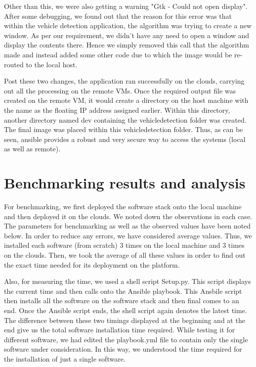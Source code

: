 \documentclass[9pt,twocolumn,twoside]{../../styles/osajnl}
\begin{document}
Other than this, we were also getting a warning "Gtk - Could not open display".  After some debugging, we found out that the reason for this error was that within the vehicle detection application, the algorithm was trying to create a new window.  As per our requirement, we didn't have any need to open a window and display the contents there.  Hence we simply removed this call that the algorithm made and instead added some other code due to which the image would be re-routed to the local host. 

Post these two changes, the application ran successfully on the clouds, carrying out all the processing on the remote VMs.  Once the required output file was created on the remote VM, it would create a directory on the host machine with the name as the floating IP address assigned earlier.  Within this directory, another directory named dev containing the vehicledetection folder was created.  The final image was placed within this vehicledetection folder.  Thus, as can be seen, ansible provides a robust and very secure way to access the systems (local as well as remote).  

\section{Benchmarking results and analysis}

For benchmarking, we first deployed the software stack onto the local
machine and then deployed it on the clouds.  We noted down the
observations in each case.  The parameters for benchmarking as well as
the observed values have been noted below.  In order to reduce any
errors, we have considered average values.  Thus, we installed each
software (from scratch) 3 times on the local machine and 3 times on
the clouds.  Then, we took the average of all these values in order to
find out the exact time needed for its deployment on the platform.

Also, for measuring the time, we used a shell script Setup.py.  This script displays the current time and then calls onto the Ansible playbook.  This Ansbile script then installs all the software on the software stack and then final comes to an end.  Once the Ansible script ends, the shell script again denotes the latest time.  The difference between these two timings displayed at the beginning and at the end give us the total software installation time required.  While testing it for different software, we had edited the playbook.yml file to contain only the single software under consideration.  In this way, we understood the time required for the installation of just a single software.  
\end{document}
